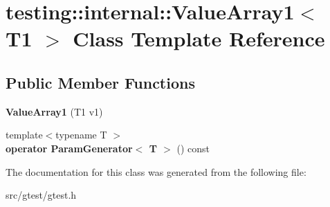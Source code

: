 \hypertarget{classtesting_1_1internal_1_1_value_array1}{}\section{testing\+:\+:internal\+:\+:Value\+Array1$<$ T1 $>$ Class Template Reference}
\label{classtesting_1_1internal_1_1_value_array1}
\subsection*{Public Member Functions}
\begin{DoxyCompactItemize}
\item 
\mbox{\label{classtesting_1_1internal_1_1_value_array1_a8eaffed25a4ddbe790472ca07595a319}} 
{\bfseries Value\+Array1} (T1 v1)
\item 
\mbox{\label{classtesting_1_1internal_1_1_value_array1_a1ffe0a28fd09efa980df1aaa3f7af2a0}} 
{\footnotesize template$<$typename T $>$ }\\{\bfseries operator Param\+Generator$<$ T $>$} () const
\end{DoxyCompactItemize}


The documentation for this class was generated from the following file\+:\begin{DoxyCompactItemize}
\item 
src/gtest/gtest.\+h\end{DoxyCompactItemize}
